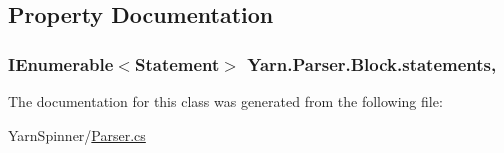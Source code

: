 \subsection{Property Documentation}
\hypertarget{a00024_a42e3d555bbd5ecbdf61c45ad715be7e1}{
\subsubsection[{statements}]{\setlength{\rightskip}{0pt plus 5cm}I\-Enumerable$<${\bf Statement}$>$ Yarn.\-Parser.\-Block.\-statements\hspace{0.3cm}{\ttfamily [get]}, {\ttfamily [package]}}}\label{a00024_a42e3d555bbd5ecbdf61c45ad715be7e1}


The documentation for this class was generated from the following file\-:\begin{DoxyCompactItemize}
\item 
Yarn\-Spinner/\hyperlink{a00269}{Parser.\-cs}\end{DoxyCompactItemize}
